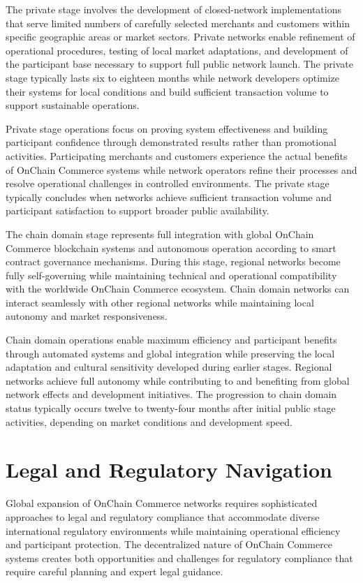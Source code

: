 \documentclass[
  Letterpaper,
]{scrbook}
\begin{document}
The private stage involves the development of closed-network
implementations that serve limited numbers of carefully selected
merchants and customers within specific geographic areas or market
sectors. Private networks enable refinement of operational procedures,
testing of local market adaptations, and development of the participant
base necessary to support full public network launch. The private stage
typically lasts six to eighteen months while network developers optimize
their systems for local conditions and build sufficient transaction
volume to support sustainable operations.

Private stage operations focus on proving system effectiveness and
building participant confidence through demonstrated results rather than
promotional activities. Participating merchants and customers experience
the actual benefits of OnChain Commerce systems while network operators
refine their processes and resolve operational challenges in controlled
environments. The private stage typically concludes when networks
achieve sufficient transaction volume and participant satisfaction to
support broader public availability.

The chain domain stage represents full integration with global OnChain
Commerce blockchain systems and autonomous operation according to smart
contract governance mechanisms. During this stage, regional networks
become fully self-governing while maintaining technical and operational
compatibility with the worldwide OnChain Commerce ecosystem. Chain
domain networks can interact seamlessly with other regional networks
while maintaining local autonomy and market responsiveness.

Chain domain operations enable maximum efficiency and participant
benefits through automated systems and global integration while
preserving the local adaptation and cultural sensitivity developed
during earlier stages. Regional networks achieve full autonomy while
contributing to and benefiting from global network effects and
development initiatives. The progression to chain domain status
typically occurs twelve to twenty-four months after initial public stage
activities, depending on market conditions and development speed.

\section{Legal and Regulatory
Navigation}\label{legal-and-regulatory-navigation}

Global expansion of OnChain Commerce networks requires sophisticated
approaches to legal and regulatory compliance that accommodate diverse
international regulatory environments while maintaining operational
efficiency and participant protection. The decentralized nature of
OnChain Commerce systems creates both opportunities and challenges for
regulatory compliance that require careful planning and expert legal
guidance.
\end{document}
